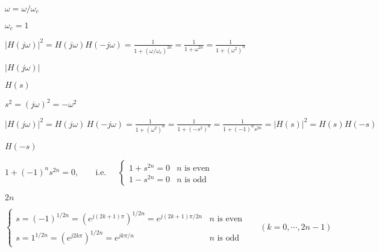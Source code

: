 \documentclass{article}
\def\lthtmlcheckvsize{\ifdim\ht\sizebox<\vsize 
  \ifdim\wd\sizebox<\hsize\expandafter\hfill\fi \expandafter\vfill
  \else\expandafter\vss\fi}%
\begin{document}
{\newpage\clearpage
{}%
$\omega=\omega/\omega_c$%
\lthtmlindisplaymathZ
\lthtmlcheckvsize\clearpage}

{\newpage\clearpage
{}%
$\omega_c=1$%
\lthtmlindisplaymathZ
\lthtmlcheckvsize\clearpage}

{\newpage\clearpage
{}%
$\displaystyle |H(j\omega)|^2=H(j\omega)H(-j\omega)
  =\frac{1}{1+(\omega/\omega_c)^{2n}}
  =\frac{1}{1+\omega^{2n}}=\frac{1}{1+(\omega^2)^n}
  $%
\lthtmlindisplaymathZ
\lthtmlcheckvsize\clearpage}

{\newpage\clearpage
{}%
$|H(j\omega)|$%
\lthtmlindisplaymathZ
\lthtmlcheckvsize\clearpage}

{\newpage\clearpage
{}%
$H(s)$%
\lthtmlindisplaymathZ
\lthtmlcheckvsize\clearpage}

{\newpage\clearpage
{}%
$s^2=(j\omega)^2=-\omega^2$%
\lthtmlindisplaymathZ
\lthtmlcheckvsize\clearpage}

{\newpage\clearpage
{}%
$\displaystyle |H(j\omega)|^2=H(j\omega)\,H(-j\omega)
  =\frac{1}{1+(\omega^2)^n}=\frac{1}{1+(-s^2)^n}
  =\frac{1}{1+(-1)^ns^{2n}}=|H(s)|^2=H(s) H(-s)
  $%
\lthtmlindisplaymathZ
\lthtmlcheckvsize\clearpage}

{\newpage\clearpage
{}%
$H(-s)$%
\lthtmlindisplaymathZ
\lthtmlcheckvsize\clearpage}

{\newpage\clearpage
{}%
$\displaystyle 1+(-1)^ns^{2n}=0,\;\;\;\;\;\;\;\mbox{i.e.}\;\;\;\;\;
  \left\{\begin{array}{ll}
  1+s^{2n}=0 & \mbox{$n$\  is even}\\
  1-s^{2n}=0 & \mbox{$n$\  is odd}\end{array}\right.
  $%
\lthtmlindisplaymathZ
\lthtmlcheckvsize\clearpage}

{\newpage\clearpage
{}%
$2n$%
\lthtmlindisplaymathZ
\lthtmlcheckvsize\clearpage}

{\newpage\clearpage
{}%
$\displaystyle \left\{\begin{array}{ll}
  s=(-1)^{1/2n}=(e^{j(2k+1)\pi})^{1/2n}=e^{j(2k+1)\pi/2n} & \mbox{$n$\  is even}\\
  s=1^{1/2n}=(e^{j2k\pi})^{1/2n}=e^{jk\pi/n} & \mbox{$n$\  is odd}
  \end{array}\right.\;\;\;\;\;\;(k=0,\cdots,2n-1)
  $%
\lthtmlindisplaymathZ
\lthtmlcheckvsize\clearpage}
\end{document}
